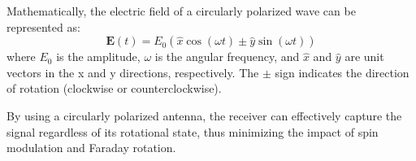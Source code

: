 Mathematically, the electric field of a circularly polarized wave can be represented as:
\[
\mathbf{E}(t) = E_0 \left( \hat{x} \cos(\omega t) \pm \hat{y} \sin(\omega t) \right)
\]
where \(E_0\) is the amplitude, \(\omega\) is the angular frequency, and \(\hat{x}\) and \(\hat{y}\) are unit vectors in the x and y directions, respectively. The \(\pm\) sign indicates the direction of rotation (clockwise or counterclockwise).

By using a circularly polarized antenna, the receiver can effectively capture the signal regardless of its rotational state, thus minimizing the impact of spin modulation and Faraday rotation.

